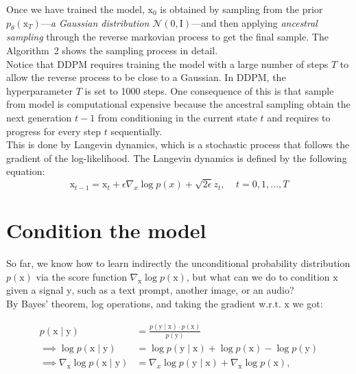 Once we have trained the model, $\mathrm{x}_{0}$ is obtained by sampling from the prior $p_{\theta}(\mathrm{x}_{T})$---\textit{a Gaussian distribution $\mathcal{N}(0, \mathrm{I})$}---and then applying \textit{ancestral sampling} through the reverse markovian process to get the final sample.  The Algorithm~2 shows the sampling process in detail. \\

\noindent Notice that DDPM requires training the model with a large number of steps $T$
to allow the reverse process to be close to a Gaussian. In DDPM, the hyperparameter $T$ is set to 1000 steps. One consequence of this is that sample from model is computational expensive because the ancestral sampling obtain the next generation $t-1$ from conditioning in the current state $t$ and requires to progress for every step $t$ sequentially. \\

\noindent {} This is done by Langevin dynamics, which is a stochastic process that follows the gradient of the log-likelihood. The Langevin dynamics is defined by the following equation:
\begin{equation}
    \mathrm{x}_{t-1} = \mathrm{x}_{t} + \epsilon \nabla_{x}\log p(x) + \sqrt{2\epsilon}z_{t}, ~~~~~ t=0,1, \dots, T
\end{equation}

    
\section{Condition the model}

So far, we know how to learn indirectly the unconditional probability distribution $p(\mathrm{x})$ via the score function $\nabla_{\mathrm{x}}\log p(\mathrm{x})$, but what can we do to condition $\mathrm{x}$ given a signal $\mathrm{y}$, such as a text prompt, another image, or an audio?\\

\noindent By Bayes' theorem, log operations, and taking the gradient w.r.t. $\mathrm{x}$ we got:

\begin{equation}
    \begin{split}
        p(\mathrm{x} \mid \mathrm{y}) &= \frac{p(\mathrm{y} \mid \mathrm{x}) \cdot p(\mathrm{x})}{p(\mathrm{y})}\\
        \implies \log p(\mathrm{x} \mid \mathrm{y}) &= \log p(\mathrm{y} \mid \mathrm{x}) + \log p(\mathrm{x}) - \log p(\mathrm{y}) \\
        \implies \nabla_\mathrm{x} \log p(\mathrm{x} \mid \mathrm{y}) &= \nabla_x \log p(\mathrm{y} \mid \mathrm{x}) + \nabla_\mathrm{x} \log p(\mathrm{x}) ,
    \end{split}
\end{equation}
    

